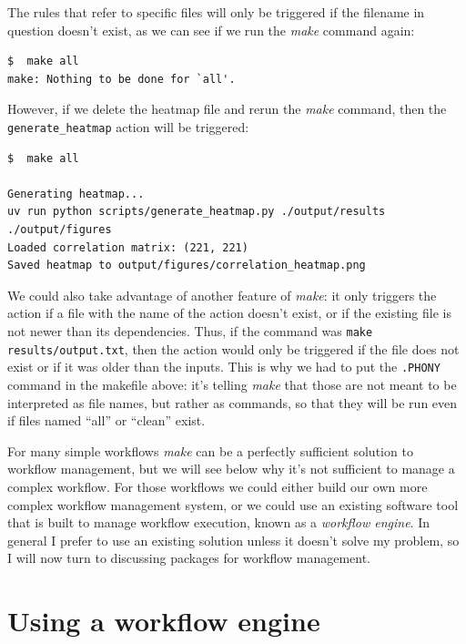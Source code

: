 The rules that refer to specific files will only be triggered if the filename in question doesn't exist, as we can see if we run the \textit{make} command again:

\begin{lstlisting}[style=shell]
$  make all
make: Nothing to be done for `all'.
\end{lstlisting}

However, if we delete the heatmap file and rerun the \textit{make} command, then the \texttt{generate\_heatmap} action will be triggered:

\begin{lstlisting}[style=shell]
$  make all

Generating heatmap...
uv run python scripts/generate_heatmap.py ./output/results ./output/figures
Loaded correlation matrix: (221, 221)
Saved heatmap to output/figures/correlation_heatmap.png
\end{lstlisting}

We could also take advantage of another feature of \textit{make}: it only triggers the action if a file with the name of the action doesn't exist, or if the existing file is not newer than its dependencies.  Thus, if the command was \texttt{make results/output.txt}, then the action would only be triggered if the file does not exist or if it was older than the inputs.  This is why we had to put the \texttt{.PHONY} command in the makefile above: it's telling \textit{make} that those are not meant to be interpreted as file names, but rather as commands, so that they will be run even if files named ``all'' or ``clean'' exist.

For many simple workflows \textit{make} can be a perfectly sufficient solution to workflow management, but we will see below why it's not sufficient to manage a complex workflow.  For those workflows we could either build our own more complex workflow management system, or we could use an existing software tool that is built to manage workflow execution, known as a \textit{workflow engine}.  In general I prefer to use an existing solution unless it doesn't solve my problem, so I will now turn to discussing packages for workflow management.

\section{Using a workflow engine}

